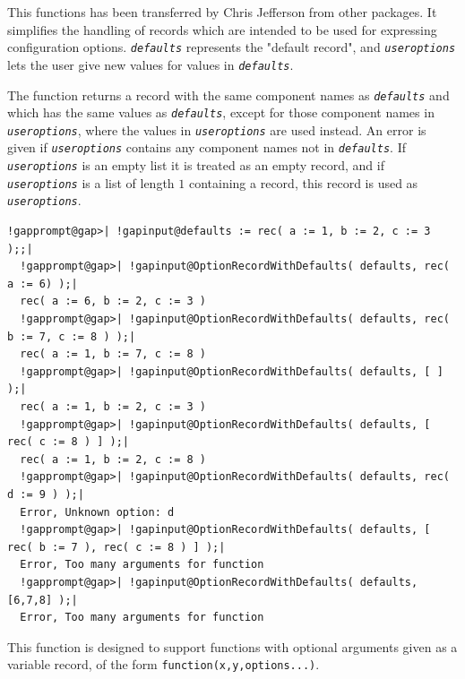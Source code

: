 \documentclass[a4paper,11pt]{report}
\begin{document}
{{{ This functions has been transferred by Chris Jefferson from other packages. It
simplifies the handling of records which are intended to be used for
expressing configuration options. \mbox{\texttt{\mdseries\slshape defaults}} represents the "default record", and \mbox{\texttt{\mdseries\slshape useroptions}} lets the user give new values for values in \mbox{\texttt{\mdseries\slshape defaults}}. 

 The function returns a record with the same component names as \mbox{\texttt{\mdseries\slshape defaults}} and which has the same values as \mbox{\texttt{\mdseries\slshape defaults}}, except for those component names in \mbox{\texttt{\mdseries\slshape useroptions}}, where the values in \mbox{\texttt{\mdseries\slshape useroptions}} are used instead. An error is given if \mbox{\texttt{\mdseries\slshape useroptions}} contains any component names not in \mbox{\texttt{\mdseries\slshape defaults}}. If \mbox{\texttt{\mdseries\slshape useroptions}} is an empty list it is treated as an empty record, and if \mbox{\texttt{\mdseries\slshape useroptions}} is a list of length $1$ containing a record, this record is used as \mbox{\texttt{\mdseries\slshape useroptions}}. 

 
\begin{Verbatim}[commandchars=!@|,fontsize=\small,frame=single,label=Example]
  !gapprompt@gap>| !gapinput@defaults := rec( a := 1, b := 2, c := 3 );;|
  !gapprompt@gap>| !gapinput@OptionRecordWithDefaults( defaults, rec( a := 6) );|
  rec( a := 6, b := 2, c := 3 )
  !gapprompt@gap>| !gapinput@OptionRecordWithDefaults( defaults, rec( b := 7, c := 8 ) );|
  rec( a := 1, b := 7, c := 8 )
  !gapprompt@gap>| !gapinput@OptionRecordWithDefaults( defaults, [ ] );|
  rec( a := 1, b := 2, c := 3 )
  !gapprompt@gap>| !gapinput@OptionRecordWithDefaults( defaults, [ rec( c := 8 ) ] );|
  rec( a := 1, b := 2, c := 8 )
  !gapprompt@gap>| !gapinput@OptionRecordWithDefaults( defaults, rec( d := 9 ) );|
  Error, Unknown option: d
  !gapprompt@gap>| !gapinput@OptionRecordWithDefaults( defaults, [ rec( b := 7 ), rec( c := 8 ) ] );|
  Error, Too many arguments for function
  !gapprompt@gap>| !gapinput@OptionRecordWithDefaults( defaults, [6,7,8] );|
  Error, Too many arguments for function
\end{Verbatim}
 This function is designed to support functions with optional arguments given
as a variable record, of the form \texttt{function(x,y,options...)}. 

}}}
\end{document}

